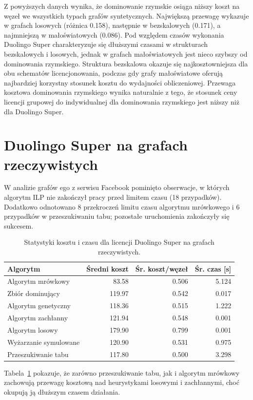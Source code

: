 Z powyższych danych wynika, że dominowanie rzymskie osiąga niższy koszt na węzeł we wszystkich typach grafów syntetycznych. Największą przewagę wykazuje w grafach losowych (różnica 0.158), następnie w bezskalowych (0.171), a najmniejszą w małoświatowych (0.086). Pod względem czasów wykonania Duolingo Super charakteryzuje się dłuższymi czasami w strukturach bezskalowych i losowych, jednak w grafach małoświatowych jest nieco szybszy od dominowania rzymskiego. Struktura bezskalowa okazuje się najkosztowniejsza dla obu schematów licencjonowania, podczas gdy grafy małoświatowe oferują najbardziej korzystny stosunek kosztu do wydajności obliczeniowej. Przewaga kosztowa dominowania rzymskiego wynika naturalnie z tego, że stosunek ceny licencji grupowej do indywidualnej dla dominowania rzymskiego jest niższy niż dla Duolingo Super.


\section{Duolingo Super na grafach rzeczywistych}
W analizie grafów ego z serwisu Facebook pominięto obserwacje, w których algorytm ILP nie zakończył pracy przed limitem czasu (18 przypadków). Dodatkowo odnotowano 8 przekroczeń limitu czasu algorytmu mrówkowego i 6 przypadków w przeszukiwaniu tabu; pozostałe uruchomienia zakończyły się sukcesem.

\begin{table}[H]
  \centering
  \caption{Statystyki kosztu i czasu dla licencji Duolingo Super na grafach rzeczywistych.}
  \label{tab:duo-real-alg}
  \begin{tabular}{lrrr}
    \toprule
    \textbf{Algorytm}     & \textbf{Średni koszt} & \textbf{Śr. koszt/węzeł} & \textbf{Śr. czas [s]} \\
    \midrule
    Algorytm mrówkowy     & 83.58                 & 0.506                    & 5.124                 \\
    Zbiór dominujący      & 119.97                & 0.542                    & 0.017                 \\
    Algorytm genetyczny   & 118.36                & 0.515                    & 1.222                 \\
    Algorytm zachłanny    & 121.94                & 0.548                    & 0.001                 \\
    Algorytm losowy       & 179.90                & 0.799                    & 0.001                 \\
    Wyżarzanie symulowane & 120.90                & 0.531                    & 0.975                 \\
    Przeszukiwanie tabu   & 117.80                & 0.500                    & 3.298                 \\
    \bottomrule
  \end{tabular}
\end{table}
Tabela~\ref{tab:duo-real-alg} pokazuje, że zarówno przeszukiwanie tabu, jak i algorytm mrówkowy zachowują przewagę kosztową nad heurystykami losowymi i zachłannymi, choć okupują ją dłuższym czasem działania.

